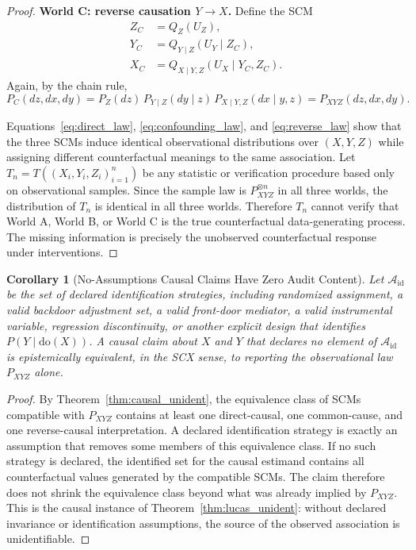 \documentclass[12pt,a4paper]{article}
\newtheorem{corollary}[theorem]{Corollary}
\begin{document}
\begin{proof}
\medskip\noindent
\textbf{World C: reverse causation $Y \to X$.}
Define the SCM
\begin{align}
    Z_C &= Q_Z(U_Z), \nonumber\\
    Y_C &= Q_{Y\mid Z}(U_Y \mid Z_C), \nonumber\\
    X_C &= Q_{X\mid Y,Z}(U_X \mid Y_C,Z_C).
    \label{eq:scm_reverse}
\end{align}
Again, by the chain rule,
\begin{equation}
    P_C(dz,dx,dy)
    = P_Z(dz)\,P_{Y\mid Z}(dy\mid z)\,P_{X\mid Y,Z}(dx\mid y,z)
    = P_{XYZ}(dz,dx,dy).
    \label{eq:reverse_law}
\end{equation}

Equations~\eqref{eq:direct_law}, \eqref{eq:confounding_law}, and
\eqref{eq:reverse_law} show that the three SCMs induce identical
observational distributions over $(X,Y,Z)$ while assigning different
counterfactual meanings to the same association.  Let
$T_n = T((X_i,Y_i,Z_i)_{i=1}^n)$ be any statistic or verification
procedure based only on observational samples.  Since the sample law is
$P_{XYZ}^{\otimes n}$ in all three worlds, the distribution of $T_n$ is
identical in all three worlds.  Therefore $T_n$ cannot verify that World A,
World B, or World C is the true counterfactual data-generating process.
The missing information is precisely the unobserved counterfactual
response under interventions.
\end{proof}

\begin{corollary}[No-Assumptions Causal Claims Have Zero Audit Content]
\label{cor:no_assumption_causal_claim}
Let $\mathcal{A}_{\mathrm{id}}$ be the set of declared identification
strategies, including randomized assignment, a valid backdoor adjustment
set, a valid front-door mediator, a valid instrumental variable, regression
discontinuity, or another explicit design that identifies
$P(Y\mid \mathrm{do}(X))$.  A causal claim about $X$ and $Y$ that declares no element
of $\mathcal{A}_{\mathrm{id}}$ is epistemically equivalent, in the SCX sense,
to reporting the observational law $P_{XYZ}$ alone.
\end{corollary}

\begin{proof}
By Theorem~\ref{thm:causal_unident}, the equivalence class of SCMs compatible
with $P_{XYZ}$ contains at least one direct-causal, one common-cause, and one
reverse-causal interpretation.  A declared identification strategy is exactly
an assumption that removes some members of this equivalence class.  If no such
strategy is declared, the identified set for the causal estimand contains all
counterfactual values generated by the compatible SCMs.  The claim therefore
does not shrink the equivalence class beyond what was already implied by
$P_{XYZ}$.  This is the causal instance of Theorem~\ref{thm:lucas_unident}:
without declared invariance or identification assumptions, the source of the
observed association is unidentifiable.
\end{proof}
\end{document}
